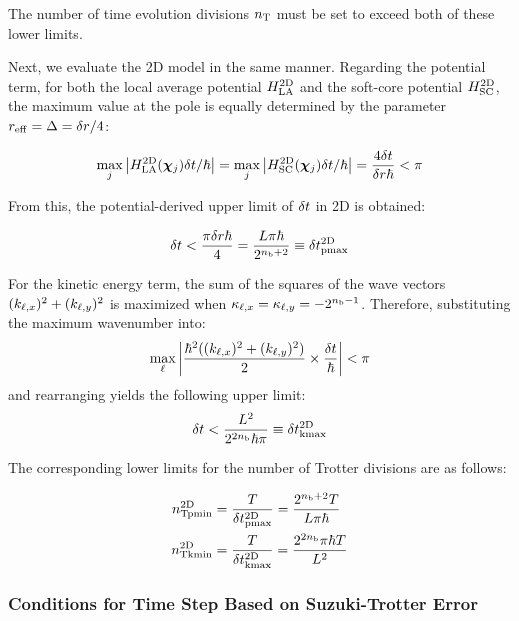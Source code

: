 \documentclass[report_2025.tex]{subfiles}
\begin{document}
The number of time evolution divisions $n_{\mathrm{T}}$ must be set to exceed both of these
lower limits.

Next, we evaluate the 2D model in the same manner. Regarding the potential term,
for both the local average potential $H_{\mathrm{LA}}^{\mathrm{2D}}$ and the soft-core potential
$H_{\mathrm{SC}}^{\mathrm{2D}}$, the maximum value at the pole is equally determined by the parameter
$r_{\mathrm{eff}}=\Delta=\delta r/4$:

\begin{equation}
\max_{j}{\left| H_{\mathrm{LA}}^{\mathrm{2D}}(\bm{\chi}_{j})\delta t/\hbar \right|}
  = \max_{j}{\left| H_{\mathrm{SC}}^{\mathrm{2D}}(\bm{\chi}_{j})\delta t/\hbar \right|}
  = \frac{4\delta t}{\delta r\hbar} < \pi
\end{equation}

From this, the potential-derived upper limit of $\delta t$ in 2D is obtained:

\begin{equation}
\delta t < \frac{\pi\delta r\hbar}{4}
        =\frac{L\pi\hbar}{2^{n_{\mathrm{b}}+2}}
        \equiv\delta t_{\mathrm{pmax}}^{\mathrm{2D}}
 \label{eq:nyqist-limit-by-hep-final-2D}
\end{equation}

For the kinetic energy term, the sum of the squares of the wave vectors
$(k_{\ell,x})^2+(k_{\ell,y})^2$ is maximized when $\kappa_{\ell,x}=\kappa_{\ell,y}=-2^{n_{\mathrm{b}}-1}$. Therefore,
substituting the maximum wavenumber into:
\begin{equation}
\max_{\ell}{\left| \frac{\hbar^2((k_{\ell,x})^2+(k_{\ell,y})^2)}{2}\times\frac{\delta t}{\hbar} \right|} < \pi
\end{equation}
and rearranging yields the following upper limit:
\begin{equation}
\delta t < \frac{L^2}{2^{2n_{\mathrm{b}}}\hbar\pi} \equiv\delta t_{\mathrm{kmax}}^{\mathrm{2D}}
 \label{eq:nyqist-limit-by-hek-final-2D}
\end{equation}

The corresponding lower limits for the number of Trotter divisions are as follows:

\begin{align}
    n_{\mathrm{Tpmin}}^{\mathrm{2D}} &= \frac{T}{\delta t_{\mathrm{pmax}}^{\mathrm{2D}}}=\frac{2^{n_{\mathrm{b}}+2}T}{L\pi\hbar} \\
    n_{\mathrm{Tkmin}}^{\mathrm{2D}} &= \frac{T}{\delta t_{\mathrm{kmax}}^{\mathrm{2D}}}=\frac{2^{2n_{\mathrm{b}}}\pi\hbar T}{L^2}
\end{align}

\subsubsection{Conditions for Time Step Based on Suzuki-Trotter Error}
\label{subsec:deltat-selection-by-trotter-error}
\end{document}
